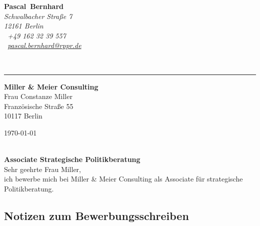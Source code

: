 \documentclass[11pt,a4paper]{article}
\def\firstname{Pascal}
\def\familyname{Bernhard}
\begin{document}
\sffamily   %
\hfill%
\begin{minipage}[t]{.6\textwidth}
	\raggedleft%
	{\bfseries {\color{firstnamecolor}\firstname}~{\color{familynamecolor}\familyname}}\\[.35ex]
	\small\itshape%
	Schwalbacher Straße 7\\
	12161 Berlin\\[.35ex]
	\Mobilefone~+49 162 32 39 557 \\
	\Letter~\href{mailto:pascal.bernhard@rppr.de}{pascal.bernhard@rppr.de}
\end{minipage}\\[0.5em]
%
{\color{firstnamecolor}\rule{\textwidth}{.25ex}}
%
\begin{minipage}[t]{.4\textwidth}
	\raggedright%
	\vspace*{1em}
	\textbf{Miller \& Meier Consulting} \\
	Frau Constanze Miller \\[.35ex]
	\small%
	Französische Straße 55\\
	10117 Berlin
\end{minipage}
%
\hfill
%
\begin{minipage}[t]{.4\textwidth}
	\raggedleft %
	\today
\end{minipage}\\[1em]


{\bfseries \color{familynamecolor}Associate Strategische Politikberatung}\\[0.75em]

Sehr geehrte Frau Miller,\\[0.5em]
%
ich bewerbe mich bei Miller \& Meier Consulting als Associate für strategische Politikberatung.



\subsection*{\textsf{Notizen zum Bewerbungsschreiben}}
\end{document}
